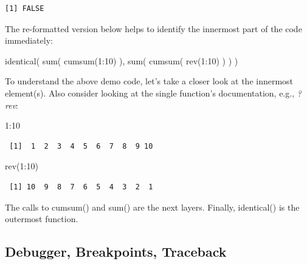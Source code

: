 \documentclass[
  12pt,
  letterpaper,
]{krantz}
\newenvironment{Shaded}{\begin{snugshade}}{\end{snugshade}}
\newcommand{\DecValTok}[1]{\textcolor[rgb]{0.68,0.00,0.00}{#1}}
\newcommand{\FunctionTok}[1]{\textcolor[rgb]{0.28,0.35,0.67}{#1}}
\newcommand{\NormalTok}[1]{\textcolor[rgb]{0.00,0.23,0.31}{#1}}
\newcommand{\SpecialCharTok}[1]{\textcolor[rgb]{0.37,0.37,0.37}{#1}}
\begin{document}
\begin{verbatim}
[1] FALSE
\end{verbatim}

The re-formatted version below helps to identify the innermost part of
the code immediately:

\begin{Shaded}
\begin{Highlighting}[]
\FunctionTok{identical}\NormalTok{(}
  \FunctionTok{sum}\NormalTok{(}
      \FunctionTok{cumsum}\NormalTok{(}\DecValTok{1}\SpecialCharTok{:}\DecValTok{10}\NormalTok{)}
\NormalTok{    ),}
  \FunctionTok{sum}\NormalTok{(}
    \FunctionTok{cumsum}\NormalTok{(}
      \FunctionTok{rev}\NormalTok{(}\DecValTok{1}\SpecialCharTok{:}\DecValTok{10}\NormalTok{)}
\NormalTok{      )}
\NormalTok{    )}
\NormalTok{  )}
\end{Highlighting}
\end{Shaded}

To understand the above demo code, let's take a closer look at the
innermost element(s). Also consider looking at the single function's
documentation, e.g., \emph{?rev}:

\begin{Shaded}
\begin{Highlighting}[]
\DecValTok{1}\SpecialCharTok{:}\DecValTok{10}
\end{Highlighting}
\end{Shaded}

\begin{verbatim}
 [1]  1  2  3  4  5  6  7  8  9 10
\end{verbatim}

\begin{Shaded}
\begin{Highlighting}[]
\FunctionTok{rev}\NormalTok{(}\DecValTok{1}\SpecialCharTok{:}\DecValTok{10}\NormalTok{)}
\end{Highlighting}
\end{Shaded}

\begin{verbatim}
 [1] 10  9  8  7  6  5  4  3  2  1
\end{verbatim}

The calls to cumsum() and sum() are the next layers. Finally,
identical() is the outermost function.

\hypertarget{debugger-breakpoints-traceback}{%
\subsection{Debugger, Breakpoints,
Traceback}\label{debugger-breakpoints-traceback}}
\end{document}
